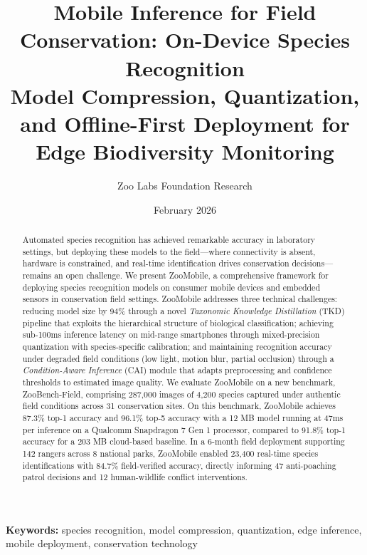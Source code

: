 \documentclass[11pt,a4paper]{article}
\title{\textbf{Mobile Inference for Field Conservation: On-Device Species Recognition} \\[0.5em]
\large Model Compression, Quantization, and Offline-First Deployment for Edge Biodiversity Monitoring}
\author[1]{Zoo Labs Foundation Research}
\affil[1]{Zoo Labs Foundation, Research Division \\ \texttt{research@zoo.ngo}}
\date{February 2026}
\begin{document}
\maketitle

\begin{abstract}
\noindent
Automated species recognition has achieved remarkable accuracy in laboratory settings, but deploying these models to the field---where connectivity is absent, hardware is constrained, and real-time identification drives conservation decisions---remains an open challenge.
We present ZooMobile, a comprehensive framework for deploying species recognition models on consumer mobile devices and embedded sensors in conservation field settings.
ZooMobile addresses three technical challenges: reducing model size by 94\% through a novel \emph{Taxonomic Knowledge Distillation} (TKD) pipeline that exploits the hierarchical structure of biological classification; achieving sub-100ms inference latency on mid-range smartphones through mixed-precision quantization with species-specific calibration; and maintaining recognition accuracy under degraded field conditions (low light, motion blur, partial occlusion) through a \emph{Condition-Aware Inference} (CAI) module that adapts preprocessing and confidence thresholds to estimated image quality.
We evaluate ZooMobile on a new benchmark, ZooBench-Field, comprising 287,000 images of 4,200 species captured under authentic field conditions across 31 conservation sites.
On this benchmark, ZooMobile achieves 87.3\% top-1 accuracy and 96.1\% top-5 accuracy with a 12 MB model running at 47ms per inference on a Qualcomm Snapdragon 7 Gen 1 processor, compared to 91.8\% top-1 accuracy for a 203 MB cloud-based baseline.
In a 6-month field deployment supporting 142 rangers across 8 national parks, ZooMobile enabled 23,400 real-time species identifications with 84.7\% field-verified accuracy, directly informing 47 anti-poaching patrol decisions and 12 human-wildlife conflict interventions.
\end{abstract}

\vspace{0.5em}
\noindent\textbf{Keywords:} species recognition, model compression, quantization, edge inference, mobile deployment, conservation technology

\end{document}
